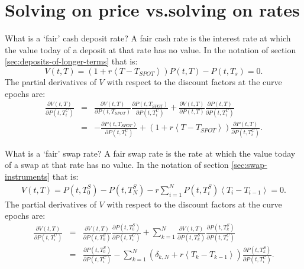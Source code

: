 \documentclass[a4paper]{article}
\begin{document}
\section{Solving on price vs.solving on rates} \label{app:solve-on-price}
What is a `fair' cash deposit rate? A fair cash rate is the interest rate at which the value today of a deposit at that rate has no value. In the notation of section \ref{sec:deposits-of-longer-terms} that is:
\begin{equation}
    V(t, T) = \left(1 + r\left<T - T_{SPOT}\right>\right)P(t, T) - P(t, T_{s}) = 0. \label{eq:fair-deposit-at-time-zero}
\end{equation}
The partial derivatives of $V$ with respect to the discount factors at the curve epochs are:
\begin{eqnarray}
  \frac{\partial{V(t, T)}}{\partial{P(t, T^{C}_{i})}} & = &\frac{\partial{V(t, T)}}{\partial{P(t, T_{SPOT})}}\frac{\partial{P(t, T_{SPOT})}}{\partial{P(t, T^{C}_{i})}}
    + \frac{\partial{V(t, T)}}{\partial{P(t, T)}}\frac{\partial{P(t, T)}}{\partial{P(t, T^{C}_{i})}} \nonumber\\
  & = & -\frac{\partial{P(t, T_{SPOT})}}{\partial{P(t, T^{C}_{i})}} 
          + \left(1 + r\left<T - T_{SPOT}\right> \right)\frac{\partial{P(t, T)}}{\partial{P(t, T^{C}_{i})}}. \label{eq:fair-deposit-partials}
\end{eqnarray}

What is a `fair' swap rate? A fair swap rate is the rate at which the value today of a swap at that rate has no value. In the notation of section \ref{sec:swap-instruments} that is:
\begin{eqnarray}
    V(t, T) = P(t, T^{S}_{0}) - P(t, T^{S}_{N}) - r\sum_{i=1}^{N}P(t, T^{S}_{i})\left<T_{i} - T_{i-1}\right> = 0. \label{eq:fair-swap-at-time-zero}
\end{eqnarray}
The partial derivatives of $V$ with respect to the discount factors at the curve epochs are:
\begin{eqnarray}
  \frac{\partial{V(t, T)}}{\partial{P(t, T^{C}_{i})}} & = 
    & \frac{\partial{V(t, T)}}{\partial{P(t, T^{S}_{0})}}\frac{\partial{P(t, T^{S}_{0})}}{\partial{P(t, T^{C}_{i})}} 
       + \sum_{k=1}^{N}\frac{\partial{V(t, T)}}{\partial{P(t, T^{S}_{k})}}\frac{\partial{P(t, T^{S}_{k})}}{\partial{P(t, T^{C}_{i})}} \nonumber \\
    & = & \frac{\partial{P(t, T^{S}_{0})}}{\partial{P(t, T^{C}_{i})}}
       - \sum_{k = 1}^{N}\left(\delta_{k, N} 
          + r\left<T_{k}-T_{k-1}\right>\right)\frac{\partial{P(t, T^{S}_{k})}}{\partial{P(t, T^{C}_{i})}}. \label{eq:fair-swap-partials}
\end{eqnarray}


\end{document}
